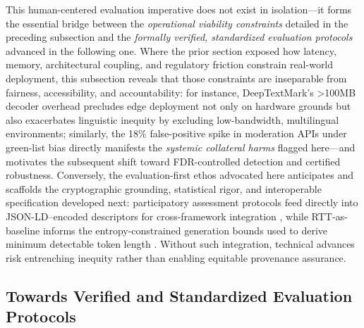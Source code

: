 \documentclass[11pt,a4paper]{article}
\begin{document}
This human-centered evaluation imperative does not exist in isolation---it forms the essential bridge between the \emph{operational viability constraints} detailed in the preceding subsection and the \emph{formally verified, standardized evaluation protocols} advanced in the following one. Where the prior section exposed how latency, memory, architectural coupling, and regulatory friction constrain real-world deployment, this subsection reveals that those constraints are inseparable from fairness, accessibility, and accountability: for instance, DeepTextMark's >100MB decoder overhead \cite{doi:10.1109/access.2024.3376693} precludes edge deployment not only on hardware grounds but also exacerbates linguistic inequity by excluding low-bandwidth, multilingual environments; similarly, the 18\% false-positive spike in moderation APIs under green-list bias \cite{arxiv:2306.09194} directly manifests the \emph{systemic collateral harms} flagged here---and motivates the subsequent shift toward FDR-controlled detection and certified robustness. Conversely, the evaluation-first ethos advocated here anticipates and scaffolds the cryptographic grounding, statistical rigor, and interoperable specification developed next: participatory assessment protocols feed directly into JSON-LD--encoded descriptors for cross-framework integration \cite{arxiv:2407.04411}, while RTT-as-baseline informs the entropy-constrained generation bounds used to derive minimum detectable token length \cite{arxiv:2307.15593}. Without such integration, technical advances risk entrenching inequity rather than enabling equitable provenance assurance.


\subsection{Towards Verified and Standardized Evaluation Protocols}
\end{document}
